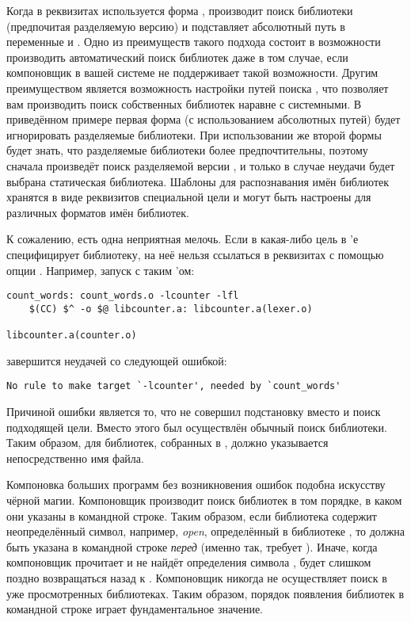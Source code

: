 Когда в реквизитах используется форма , \GNUmake{}
производит поиск библиотеки (предпочитая разделяемую версию) и
подставляет абсолютный путь в переменные \variable{\$\^} и
. Одно из преимуществ такого подхода состоит в
возможности производить автоматический поиск библиотек даже в том
случае, если компоновщик в вашей системе не поддерживает такой
возможности. Другим преимуществом является возможность настройки
путей поиска \GNUmake{}, что позволяет вам производить поиск
собственных библиотек наравне с системными. В приведённом примере
первая форма (с использованием абсолютных путей) будет игнорировать
разделяемые библиотеки. При использовании же второй формы \GNUmake{}
будет знать, что разделяемые библиотеки более предпочтительны, поэтому
сначала произведёт поиск разделяемой версии , и только в
случае неудачи будет выбрана статическая библиотека. Шаблоны
для распознавания имён библиотек хранятся в виде реквизитов специальной
цели  и могут быть настроены для различных
форматов имён библиотек.

К сожалению, есть одна неприятная мелочь. Если в какая-либо цель в
\Makefile{}'е специфицирует библиотеку, на неё нельзя ссылаться в
реквизитах с помощью опции .  Например, запуск \GNUmake{}
с таким \Makefile{}'ом:

{\footnotesize
\begin{verbatim}
count_words: count_words.o -lcounter -lfl
    $(CC) $^ -o $@ libcounter.a: libcounter.a(lexer.o)

libcounter.a(counter.o)
\end{verbatim}
}

{\noindent завершится неудачей со следующей ошибкой:}

{\footnotesize
\begin{verbatim}
No rule to make target `-lcounter', needed by `count_words'
\end{verbatim}
}

Причиной ошибки является то, что \GNUmake{} не совершил подстановку
 вместо  и поиск подходящей
цели. Вместо этого был осуществлён обычный поиск библиотеки. Таким
образом, для библиотек, собранных в \GNUmake{}, должно указывается
непосредственно имя файла.

Компоновка больших программ без возникновения ошибок подобна искусству
чёрной магии. Компоновщик производит поиск библиотек в том порядке, в
каком они указаны в командной строке. Таким образом, если библиотека
 содержит неопределённый символ, например, \textit{open},
определённый в библиотеке , то  должна быть
указана в командной строке \emph{перед}  (именно так,
 требует ). Иначе, когда компоновщик прочитает
 и не найдёт определения символа , будет
слишком поздно возвращаться назад к . Компоновщик никогда не
осуществляет поиск в уже просмотренных библиотеках. Таким образом,
порядок появления библиотек в командной строке играет фундаментальное
значение.

